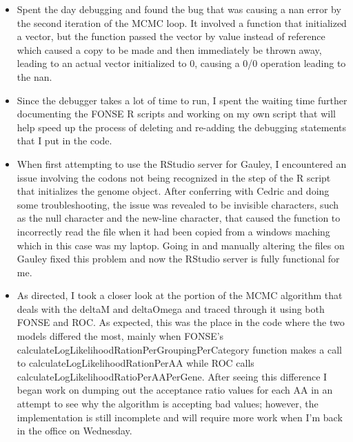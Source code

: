 \documentclass[11pt]{labbook}
\begin{document}
    \begin{itemize}
        \item Spent the day debugging and found the bug that was causing a nan error by the second iteration of the MCMC loop. It involved a function that initialized a vector, but the function passed the vector by value instead of reference which caused a copy to be made and then immediately be thrown away, leading to an actual vector initialized to 0, causing a 0/0 operation leading to the nan.
        \item Since the debugger takes a lot of time to run, I spent the waiting time further documenting the FONSE R scripts and working on my own script that will help speed up the process of deleting and re-adding the debugging statements that I put in the code.
    \end{itemize}
    
    \begin{itemize}
        \item When first attempting to use the RStudio server for Gauley, I encountered an issue involving the codons not being recognized in the step of the R script that initializes the genome object. After conferring with Cedric and doing some troubleshooting, the issue was revealed to be invisible characters, such as the null character and the new-line character, that caused the function to incorrectly read the file when it had been copied from a windows maching which in this case was my laptop. Going in and manually altering the files on Gauley fixed this problem and now the RStudio server is fully functional for me.
        \item As directed, I took a closer look at the portion of the MCMC algorithm that deals with the deltaM and deltaOmega and traced through it using both FONSE and ROC. As expected, this was the place in the code where the two models differed the most, mainly when FONSE's calculateLogLikelihoodRationPerGroupingPerCategory function makes a call to calculateLogLikelihoodRationPerAA while ROC calls calculateLogLikelihoodRatioPerAAPerGene. After seeing this difference I began work on dumping out the acceptance ratio values for each AA in an attempt to see why the algorithm is accepting bad values; however, the implementation is still incomplete and will require more work when I'm back in the office on Wednesday.
    \end{itemize}
    
\end{document}
